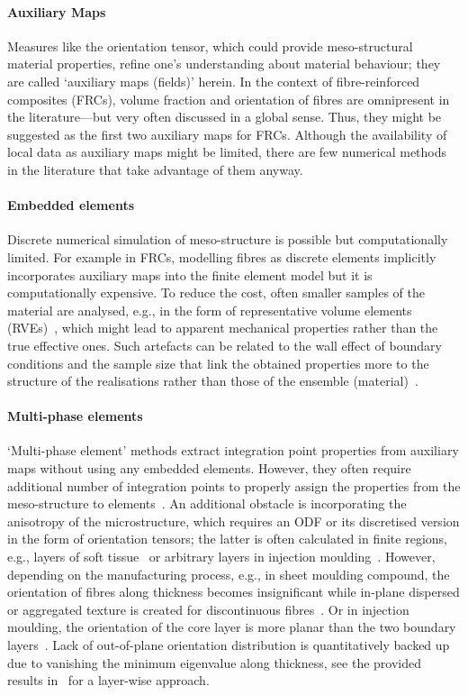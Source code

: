 	\paragraph{Auxiliary Maps} Measures like the orientation tensor, which could provide meso-structural material properties, refine one's understanding about material behaviour; they are called `auxiliary maps (fields)' herein. In the context of fibre-reinforced composites (FRCs), volume fraction and orientation of fibres are omnipresent in the literature---but very often discussed in a global sense. Thus, they might be suggested as the first two auxiliary maps for FRCs. Although the availability of local data as auxiliary maps might be limited, there are few numerical methods in the literature that take advantage of them anyway.  
	
	\paragraph{Embedded elements} Discrete numerical simulation of meso-structure is possible but computationally limited. For example in FRCs, modelling fibres as discrete elements implicitly incorporates auxiliary maps into the finite element model but it is computationally expensive. To reduce the cost, often smaller samples of the material are analysed, e.g., in the form of representative volume elements (RVEs)~\autocite{Javanbakht.2016b,Javanbakht.2016}, which might lead to apparent mechanical properties rather than the true effective ones. Such artefacts can be related to the wall effect of boundary conditions and the sample size that link the obtained properties more to the structure of the realisations rather than those of the ensemble (material)~\autocite{Bohm.2020}.
	
	\paragraph{Multi-phase elements} `Multi-phase element' methods extract integration point properties from auxiliary maps without using any embedded elements. However, they often require additional number of integration points to properly assign the properties from the meso-structure to elements~\autocite{Zohdi.2001}. An additional obstacle is incorporating the anisotropy of the microstructure, which requires an ODF or its discretised version in the form of orientation tensors; the latter is often calculated in finite regions, e.g., layers of soft tissue~\autocite{Gasser.2006} or arbitrary layers in injection moulding~\autocite{Muller.2016}. However, depending on the manufacturing process, e.g., in sheet moulding compound, the orientation of fibres along thickness becomes insignificant while in-plane dispersed or aggregated texture is created for discontinuous fibres~\autocite{Eduljee.2006}. Or in injection moulding, the orientation of the core layer is more planar than the two boundary layers~\autocite{Advani.1987}. Lack of out-of-plane orientation distribution is quantitatively backed up due to vanishing the minimum eigenvalue along thickness, see the provided results in~\autocite{Muller.2016} for a layer-wise approach. 
	
